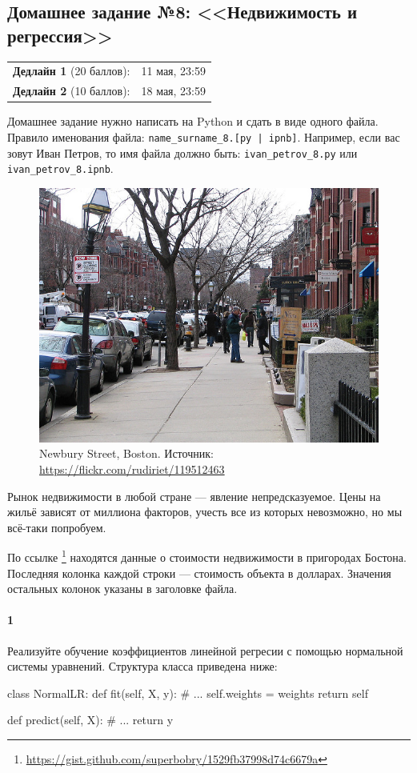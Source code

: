 \documentclass[a4paper,12pt]{article}
\begin{document}
\subsection*{Домашнее задание №8: <<Недвижимость и регрессия>>}

\begin{tabular}{@{}lr}
  \textbf{Дедлайн 1} (20 баллов): &  11 мая, 23:59 \\
  \textbf{Дедлайн 2} (10 баллов): &  18 мая, 23:59 \\
\end{tabular}

Домашнее задание нужно написать на Python и сдать в виде одного файла.
Правило именования файла: \texttt{name\_surname\_8.[py | ipnb]}. Например, если
вас зовут Иван Петров, то имя файла должно быть: \texttt{ivan\_petrov\_8.py} или \texttt{ivan\_petrov\_8.ipnb}.

\makebox[\linewidth]{\hrulefill}

\begin{figure}[h!]
  \centering
  \includegraphics[width=.7\linewidth]{images/houses}
  \caption{Newbury Street, Boston. Источник: \url{https://flickr.com/rudiriet/119512463}}
\end{figure}

Рынок недвижимости в любой стране --- явление непредсказуемое. Цены на жильё
зависят от миллиона факторов, учесть все из которых невозможно, но мы всё-таки
попробуем.

По ссылке%
\footnote{\url{https://gist.github.com/superbobry/1529fb37998d74c6679a}}
находятся данные о стоимости недвижимости в пригородах Бостона. Последняя
колонка каждой строки --- стоимость объекта в долларах. Значения остальных
колонок указаны в заголовке файла.


\paragraph{1} Реализуйте обучение коэффициентов линейной регресии с помощью
нормальной системы уравнений. Структура класса приведена ниже:
\begin{python3}
class NormalLR:
    def fit(self, X, y):
        # ...
        self.weights = weights
        return self

    def predict(self, X):
        # ...
        return y
\end{python3}
\end{document}

